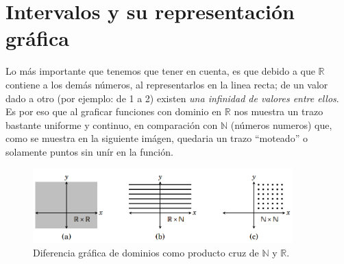 \documentclass[letterpaper, 12pt]{article}
\begin{document}
        \section{Intervalos y su representación gráfica}
        Lo más importante que tenemos que tener en cuenta, es que debido a que \(\mathbb{R}\) contiene a los demás números, al representarlos en la linea recta; de un valor dado a otro (por ejemplo: de 1 a 2) existen \emph{una infinidad de valores entre ellos}.
        Es por eso que al graficar funciones con dominio en \(\mathbb{R}\) nos muestra un trazo bastante uniforme y continuo, en comparación con \(\mathbb{N}\) (números numeros) que, como se muestra en la siguiente imágen, quedaria un trazo ``moteado'' o solamente puntos sin unír en la función.
        \begin{figure}[H]
            \centering
            \includegraphics[width=10cm]{nvsr.PNG}
            \caption{Diferencia gráfica de dominios como producto cruz de \(\mathbb{N}\) y \(\mathbb{R}\).}
            \label{fig:nvsr}
        \end{figure}
\end{document}

